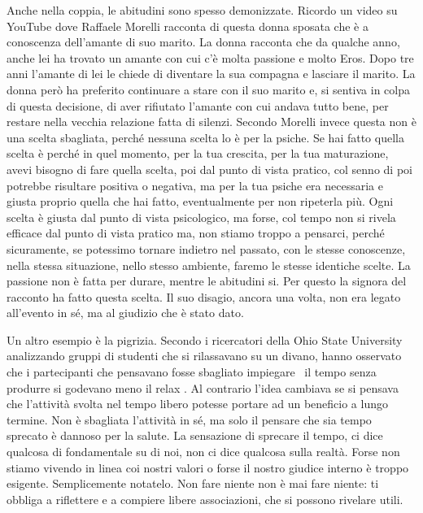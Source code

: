 \documentclass[12pt]{book} %
\begin{document}
\begin{mdframed}[linewidth=1pt]
Anche nella coppia, le abitudini sono spesso demonizzate. Ricordo un video su YouTube dove Raffaele Morelli racconta di
questa donna sposata che è a conoscenza dell'amante di suo marito. La donna racconta che da
qualche anno, anche lei ha trovato un amante con cui c'è molta passione e molto Eros. Dopo tre anni l'amante di lei le
chiede di diventare la sua compagna e lasciare il marito. La donna però ha preferito continuare a stare con il suo
marito e, si sentiva in colpa di questa decisione, di aver rifiutato l'amante con cui andava tutto
bene, per restare nella vecchia relazione fatta di silenzi. Secondo Morelli invece questa non è una scelta sbagliata,
perché nessuna scelta lo è per la psiche. Se hai fatto quella scelta è perché in quel momento, per la tua crescita, per
la tua maturazione, avevi bisogno di fare quella scelta, poi dal punto di vista pratico, col senno di poi potrebbe
risultare positiva o negativa, ma per la tua psiche era necessaria e giusta proprio quella che hai fatto, eventualmente
per non ripeterla più. Ogni scelta è giusta dal punto di vista psicologico, ma forse, col tempo non si rivela efficace
dal punto di vista pratico ma, non stiamo troppo a pensarci, perché sicuramente, se potessimo tornare indietro nel
passato, con le stesse conoscenze, nella stessa situazione, nello stesso ambiente, faremo le stesse identiche scelte.
La passione non è fatta per durare, mentre le abitudini si. Per questo la signora del racconto ha fatto questa scelta.
Il suo disagio, ancora una volta, non era legato all'evento in sé, ma al giudizio che è stato
dato.

Un altro esempio è la pigrizia. Secondo i ricercatori della Ohio State University analizzando gruppi di studenti che si
rilassavano su un divano, hanno osservato che i partecipanti che pensavano fosse sbagliato impiegare \ il tempo senza
{\textquotedbl}produrre{\textquotedbl} si godevano meno il relax . Al contrario l'idea cambiava se
si pensava che l'attività svolta nel tempo libero potesse portare ad un beneficio a lungo termine. Non è sbagliata
l'attività in sé, ma solo il pensare che sia tempo sprecato è dannoso per la salute. La sensazione
di sprecare il tempo, ci dice qualcosa di fondamentale su di noi, non ci dice qualcosa sulla realtà. Forse non stiamo
vivendo in linea coi nostri valori o forse il nostro giudice interno è troppo esigente. Semplicemente notatelo. Non
fare niente non è mai fare niente: ti obbliga a riflettere e a compiere libere associazioni, che si possono rivelare
utili.
\end{mdframed}
\end{document}
